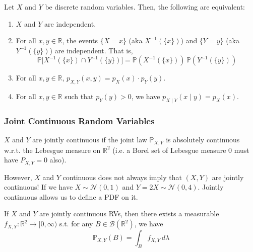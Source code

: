 \documentclass{article}
\begin{document}
      \begin{theorem}[TFAE]
        Let $X$ and $Y$ be discrete random variables. Then, the following are equivalent: 
        \begin{enumerate}
          \item $X$ and $Y$ are independent. 
          \item For all $x, y \in \mathbb{R}$, the events $\{X = x\}$ (aka $X^{-1} (\{x\})$) and $\{Y = y\}$ (aka $Y^{-1} (\{y\})$) are independent. That is, 
          \begin{equation}
            \mathbb{P} \big[ X^{-1}(\{x\}) \cap Y^{-1}(\{y\}) \big] = \mathbb{P}(X^{-1}(\{x\})) \, \mathbb{P}(Y^{-1}(\{y\}))
          \end{equation}
          \item For all $x, y \in \mathbb{R}$, $p_{X, Y} (x, y) = p_X (x) \cdot p_Y (y)$. 
          \item For all $x, y \in \mathbb{R}$ such that $p_Y (y) > 0$, we have $p_{X \mid Y}(x \mid y) = p_X (x)$. 
        \end{enumerate}
      \end{theorem}

    \subsubsection{Joint Continuous Random Variables}

      \begin{definition}
        $X$ and $Y$ are jointly continuous if the joint law $\mathbb{P}_{X, Y}$ is absolutely continuous w.r.t. the Lebesgue measure on $\mathbb{R}^2$ (i.e. a Borel set of Lebesgue measure $0$ must have $P_{X, Y} = 0$ also). 
      \end{definition}

      However, $X$ and $Y$ continuous does not always imply that $(X, Y)$ are jointly continuous! If we have $X \sim \mathcal{N}(0, 1)$ and $Y = 2 X \sim \mathcal{N}(0, 4)$. Jointly continuous allows us to define a PDF on it. 

      \begin{theorem}
        If $X$ and $Y$ are jointly continuous RVs, then there exists a measurable $f_{X, Y} : \mathbb{R}^2 \longrightarrow [0, \infty)$ s.t. for any $B \in \mathcal{B}(\mathbb{R}^2)$, we have 
        \begin{equation}
          \mathbb{P}_{X, Y} (B) = \int_B f_{X, Y} \, d\lambda
        \end{equation}
      \end{theorem}
\end{document}
